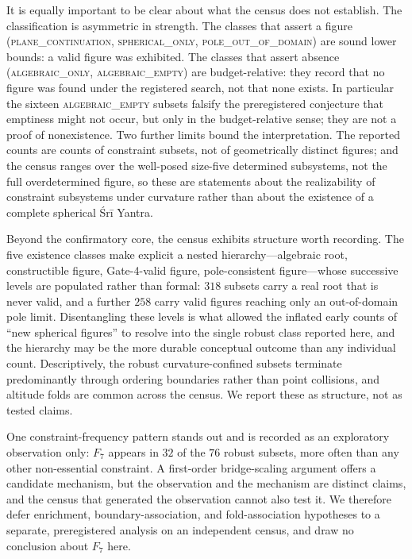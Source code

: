 \documentclass[11pt]{article}
\begin{document}
It is equally important to be clear about what the census does not establish. The classification is asymmetric in strength. The classes that assert a figure (\textsc{plane\_continuation}, \textsc{spherical\_only},
\textsc{pole\_out\_of\_domain}) are sound lower bounds: a valid figure was exhibited. The classes that assert absence (\textsc{algebraic\_only}, \textsc{algebraic\_empty}) are budget-relative: they record that no figure was found under the registered search, not that none exists. In particular the sixteen \textsc{algebraic\_empty} subsets falsify the preregistered conjecture that emptiness might not occur, but only in the budget-relative sense; they are not a proof of nonexistence. Two further limits bound the interpretation. The reported counts are counts of constraint subsets, not of geometrically distinct figures; and the census ranges over the well-posed size-five determined subsystems, not the full overdetermined figure, so these are statements about the realizability of constraint subsystems under curvature rather than about the existence of a complete spherical Śrī Yantra.

Beyond the confirmatory core, the census exhibits structure worth recording. The five existence classes make explicit a nested hierarchy---algebraic root, constructible figure, Gate-4-valid figure, pole-consistent figure---whose successive levels are populated rather than formal: $318$ subsets carry a real root that is never valid, and a further $258$ carry valid figures reaching only an out-of-domain pole limit. Disentangling these levels is what allowed the inflated early counts of ``new spherical figures'' to resolve into the single robust class reported here, and the hierarchy may be the more durable conceptual outcome than any individual count. Descriptively, the robust curvature-confined subsets terminate predominantly through ordering boundaries rather than point collisions, and altitude folds are common across the census. We report these as structure, not as tested claims.

One constraint-frequency pattern stands out and is recorded as an exploratory
observation only: $F_7$ appears in $32$ of the $76$ robust subsets, more often than any other non-essential constraint. A first-order bridge-scaling argument offers a candidate mechanism, but the observation and the mechanism are distinct claims, and the census that generated the observation cannot also test it. We therefore defer enrichment, boundary-association, and fold-association hypotheses to a separate, preregistered analysis on an independent census, and draw no conclusion about $F_7$ here.
\end{document}
